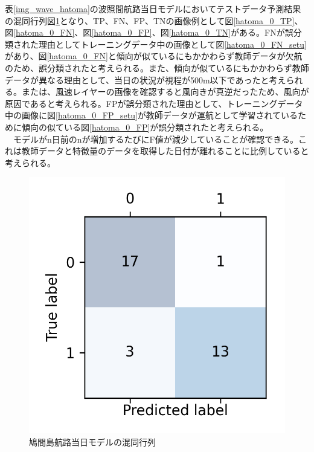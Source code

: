 表\ref{img_wave_hatoma}の波照間航路当日モデルにおいてテストデータ予測結果の混同行列図\ref{hatoma_0_conf}となり、TP、FN、FP、TNの画像例として図\ref{hatoma_0_TP}、図\ref{hatoma_0_FN}、図\ref{hatoma_0_FP}、図\ref{hatoma_0_TN}がある。FNが誤分類された理由としてトレーニングデータ中の画像として図\ref{hatoma_0_FN_setu}があり、図\ref{hatoma_0_FN}と傾向が似ているにもかかわらず教師データが欠航のため、誤分類されたと考えられる。また、傾向が似ているにもかかわらず教師データが異なる理由として、当日の状況が視程が500m以下\cite{stan}であったと考えられる。または、風速レイヤーの画像を確認すると風向きが真逆だったため、風向が原因であると考えられる。FPが誤分類された理由として、トレーニングデータ中の画像に図\ref{hatoma_0_FP_setu}が教師データが運航として学習されているために傾向の似ている図\ref{hatoma_0_FP}が誤分類されたと考えられる。
\\　モデルがn日前のnが増加するたびにF値が減少していることが確認できる。これは教師データと特徴量のデータを取得した日付が離れることに比例していると考えられる。

\begin{figure}[H]
 \centering
 \includegraphics[keepaspectratio, scale=0.8]{fig/chapter4/wave_hatoma_0/hatoma_route_hatoma_dep_0.png}
 \caption{鳩間島航路当日モデルの混同行列}
 \label{hatoma_0_conf}
\end{figure}

